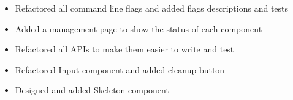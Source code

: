 \documentclass{resume}
\newcommand{\en}[1]{#1}
\newcommand{\zh}[1]{}
\begin{document}
\en{}
\zh{\role{活跃贡献者}{\href{https://github.com/grafana/phlare/commits?author=hi-rustin}{28+ 个提交}}}
\begin{itemize}
      \item \en{Refactored all command line flags and added flags descriptions and tests}
            \zh{重构了所有命令行参数，并添加了参数说明和测试}
      \item \en{Added a management page to show the status of each component}
            \zh{添加了管理页面展示各组件状态}
      \item \en{Refactored all APIs to make them easier to write and test}
            \zh{重构了所有 API 使其更容易编写和测试}
\end{itemize}

\en{}
\zh{\role{前维护者}{\href{https://github.com/ant-design/ant-design/commits?author=hi-rustin}{24+ 个提交}}}
\begin{itemize}
      \item \en{Refactored Input component and added cleanup button}
            \zh{重构了 Input 组件，添加清理按钮}
      \item \en{Designed and added Skeleton component}
            \zh{设计并添加了 Skeleton 组件}
\end{itemize}
\end{document}
